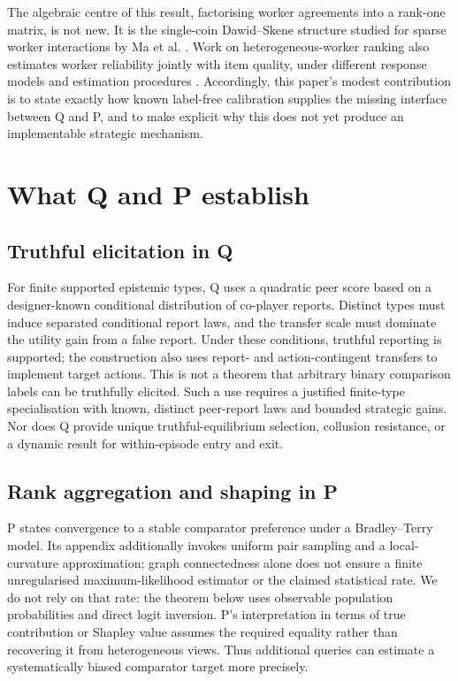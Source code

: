 \documentclass{article}
\begin{document}
The algebraic centre of this result, factorising worker agreements into a rank-one matrix, is not new.  It is the single-coin Dawid--Skene structure studied for sparse worker interactions by Ma et al. \cite{ma2017crowdsourcing,ma2019gradient}.  Work on heterogeneous-worker ranking also estimates worker reliability jointly with item quality, under different response models and estimation procedures \cite{nordio2023quite,shejole2026signal}.  Accordingly, this paper's modest contribution is to state exactly how known label-free calibration supplies the missing interface between Q and P, and to make explicit why this does not yet produce an implementable strategic mechanism. %

\section{What Q and P establish}

\subsection{Truthful elicitation in Q}

For finite supported epistemic types, Q uses a quadratic peer score based on a designer-known conditional distribution of co-player reports.  Distinct types must induce separated conditional report laws, and the transfer scale must dominate the utility gain from a false report.  Under these conditions, truthful reporting is supported; the construction also uses report- and action-contingent transfers to implement target actions. %
This is not a theorem that arbitrary binary comparison labels can be truthfully elicited.  Such a use requires a justified finite-type specialisation with known, distinct peer-report laws and bounded strategic gains. %
Nor does Q provide unique truthful-equilibrium selection, collusion resistance, or a dynamic result for within-episode entry and exit. %

\subsection{Rank aggregation and shaping in P}

P states convergence to a stable comparator preference under a Bradley--Terry model.  Its appendix additionally invokes uniform pair sampling and a local-curvature approximation; graph connectedness alone does not ensure a finite unregularised maximum-likelihood estimator or the claimed statistical rate.  We do not rely on that rate: the theorem below uses observable population probabilities and direct logit inversion.  P's interpretation in terms of true contribution or Shapley value assumes the required equality rather than recovering it from heterogeneous views. %
Thus additional queries can estimate a systematically biased comparator target more precisely. %
\end{document}

